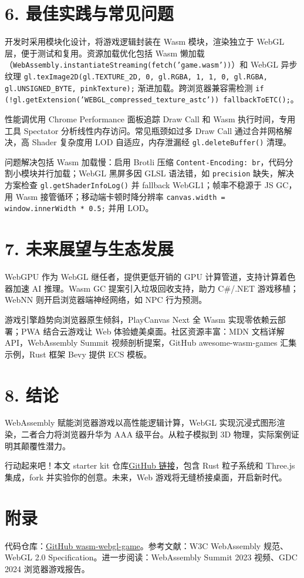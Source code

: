 \chapter{6. 最佳实践与常见问题}
开发时采用模块化设计，将游戏逻辑封装在 Wasm 模块，渲染独立于 WebGL 层，便于测试和复用。资源加载优化包括 Wasm 懒加载（\texttt{WebAssembly.instantiateStreaming(fetch('game.wasm'))}）和 WebGL 异步纹理 \texttt{gl.texImage2D(gl.TEXTURE\_{}2D, 0, gl.RGBA, 1, 1, 0, gl.RGBA, gl.UNSIGNED\_{}BYTE, pinkTexture);} 渐进加载。跨浏览器兼容需检测 \texttt{if (!gl.getExtension('WEBGL\_{}compressed\_{}texture\_{}astc')) fallbackToETC();}。\par
性能调优用 Chrome Performance 面板追踪 Draw Call 和 Wasm 执行时间，专用工具 Spectator 分析线性内存访问。常见瓶颈如过多 Draw Call 通过合并网格解决，高 Shader 复杂度用 LOD 自适应，内存泄漏经 \texttt{gl.deleteBuffer()} 清理。\par
问题解决包括 Wasm 加载慢：启用 Brotli 压缩 \texttt{Content-Encoding: br}，代码分割小模块并行加载；WebGL 黑屏多因 GLSL 语法错，如 \texttt{precision} 缺失，解决方案检查 \texttt{gl.getShaderInfoLog()} 并 fallback WebGL1；帧率不稳源于 JS GC，用 Wasm 接管循环；移动端卡顿时降分辨率 \texttt{canvas.width = window.innerWidth * 0.5;} 并用 LOD。\par
\chapter{7. 未来展望与生态发展}
WebGPU 作为 WebGL 继任者，提供更低开销的 GPU 计算管道，支持计算着色器加速 AI 推理。Wasm GC 提案引入垃圾回收支持，助力 C\#{}/.NET 游戏移植；WebNN 则开启浏览器端神经网络，如 NPC 行为预测。\par
游戏引擎趋势向浏览器原生倾斜，PlayCanvas Next 全 Wasm 实现零依赖云部署；PWA 结合云游戏让 Web 体验媲美桌面。社区资源丰富：MDN 文档详解 API，WebAssembly Summit 视频剖析提案，GitHub awesome-wasm-games 汇集示例，Rust 框架 Bevy 提供 ECS 模板。\par
\chapter{8. 结论}
WebAssembly 赋能浏览器游戏以高性能逻辑计算，WebGL 实现沉浸式图形渲染，二者合力将浏览器升华为 AAA 级平台。从粒子模拟到 3D 物理，实际案例证明其颠覆性潜力。\par
行动起来吧！本文 starter kit 仓库\href{https://github.com/example/wasm-webgl-game}{GitHub 链接}，包含 Rust 粒子系统和 Three.js 集成，fork 并实验你的创意。未来，Web 游戏将无缝桥接桌面，开启新时代。\par
\chapter{附录}
代码仓库：\href{https://github.com/example/wasm-webgl-game}{GitHub wasm-webgl-game}。参考文献：W3C WebAssembly 规范、WebGL 2.0 Specification。进一步阅读：WebAssembly Summit 2023 视频、GDC 2024 浏览器游戏报告。\par
